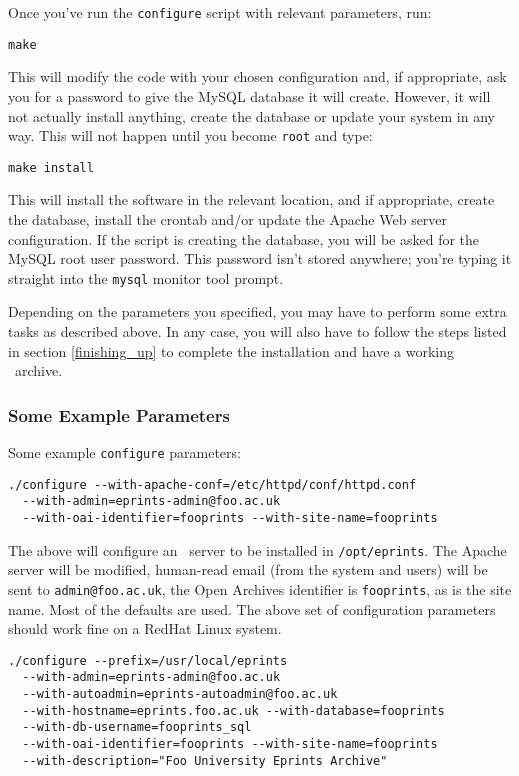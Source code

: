 Once you've run the {\tt configure} script with relevant parameters, run:

\begin{verbatim}
make
\end{verbatim}

This will modify the code with your chosen configuration and, if appropriate, ask you for a password to give the MySQL database it will create. However, it will not actually install anything, create the database or update your system in any way. This will not happen until you become {\tt root} and type:

\begin{verbatim}
make install
\end{verbatim}

This will install the software in the relevant location, and if appropriate, create the database, install the crontab and/or update the Apache Web server configuration. If the script is creating the database, you will be asked for the MySQL root user password. This password isn't stored anywhere; you're typing it straight into the {\tt mysql} monitor tool prompt.

Depending on the parameters you specified, you may have to perform some extra tasks as described above. In any case, you will also have to follow the steps listed in section \ref{finishing_up} to complete the installation and have a working \eprints\ archive.


\subsubsection{Some Example Parameters}
\label{example_conf_params}

Some example {\tt configure} parameters:

\begin{verbatim}
./configure --with-apache-conf=/etc/httpd/conf/httpd.conf
  --with-admin=eprints-admin@foo.ac.uk
  --with-oai-identifier=fooprints --with-site-name=fooprints
\end{verbatim}

The above will configure an \eprints\ server to be installed in {\tt /opt/eprints}. The Apache server will be modified, human-read email (from the system and users) will be sent to {\tt admin@foo.ac.uk}, the Open Archives identifier is {\tt fooprints}, as is the site name. Most of the defaults are used. The above set of configuration parameters should work fine on a RedHat Linux system.

\begin{verbatim}
./configure --prefix=/usr/local/eprints
  --with-admin=eprints-admin@foo.ac.uk
  --with-autoadmin=eprints-autoadmin@foo.ac.uk
  --with-hostname=eprints.foo.ac.uk --with-database=fooprints
  --with-db-username=fooprints_sql
  --with-oai-identifier=fooprints --with-site-name=fooprints
  --with-description="Foo University Eprints Archive"
\end{verbatim}

